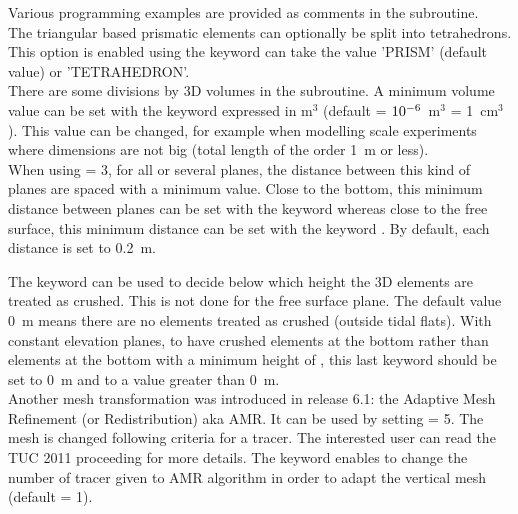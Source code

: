 Various programming examples are provided as comments in the
 subroutine.\\

The triangular based prismatic elements can optionally be split into
tetrahedrons. This option is enabled using the  keyword can
take the value 'PRISM' (default value) or 'TETRAHEDRON'.\\

There are some divisions by 3D volumes in the  subroutine.
A minimum volume value can be set with the keyword
 expressed in m$^3$
(default = $10^{\rm{-6}}$~m$^3$ = 1~cm$^3$).
This value can be changed, for example when modelling scale experiments where
dimensions are not big (total length of the order 1~m or less).\\

When using  = 3, for all or several planes,
the distance between this kind of planes are spaced with a minimum value.
Close to the bottom, this minimum distance between planes can be set with the
keyword 
whereas close to the free surface, this minimum distance can be set with the
keyword .
By default, each distance is set to 0.2~m.

The keyword  can be used
to decide below which height the 3D elements are treated as crushed.
This is not done for the free surface plane.
The default value 0~m means there are no elements treated as crushed
(outside tidal flats).
With constant elevation planes, to have crushed elements at the bottom rather
than elements at the bottom with a minimum height of
,
this last keyword should be set to 0~m and
 to a value greater than 0~m.
\\

Another mesh transformation was introduced in release 6.1:
the Adaptive Mesh Refinement (or Redistribution) aka AMR.
It can be used by setting  = 5.
The mesh is changed following criteria for a tracer.
The interested user can read the TUC 2011 proceeding \cite{Cawthorn2011}
for more details.
The keyword  enables to change the number of
tracer given to AMR algorithm in order to adapt the vertical mesh (default = 1).


